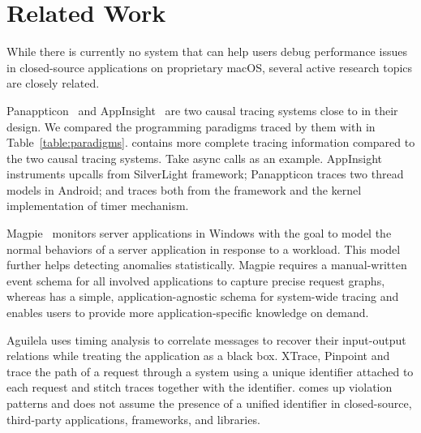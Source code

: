 \section{Related Work}
\label{sec:related-work}

While there is currently no system that can help users debug performance
issues in closed-source applications on proprietary macOS, several active
research topics are closely related.



Panappticon~\cite{zhang2013panappticon} and
AppInsight~\cite{ravindranath2012appinsight} are two causal tracing systems
close to \xxx in their design. We compared the programming paradigms traced
by them with \xxx in Table~\ref{table:paradigms}. \xxx contains more complete
tracing information compared to the two causal tracing systems. Take async
calls as an example. AppInsight instruments upcalls from SilverLight framework;
Panappticon traces two thread models in Android; and \xxx traces both from the
framework and the kernel implementation of timer mechanism.

Magpie~\cite{barham2004using} monitors server applications in Windows with the
goal to model the normal behaviors of a server application in response to a
workload. This model further helps detecting anomalies statistically. Magpie
requires a manual-written event schema for all involved applications to capture
precise request graphs, whereas \xxx has a simple, application-agnostic schema
for system-wide tracing and enables users to provide more application-specific
knowledge on demand.

Aguilela \cite{aguilera2003performance} uses timing analysis to correlate
messages to recover their input-output relations while treating the application
as a black box. XTrace, Pinpoint and \etc ~\cite{fonseca2007x, chen2002pinpoint,
chow2014mystery} trace the path of a request through a system using a unique
identifier attached to each request and stitch traces together with the
identifier. \xxx comes up violation patterns and does not assume the presence of
a unified identifier in closed-source, third-party applications, frameworks, and
libraries.



